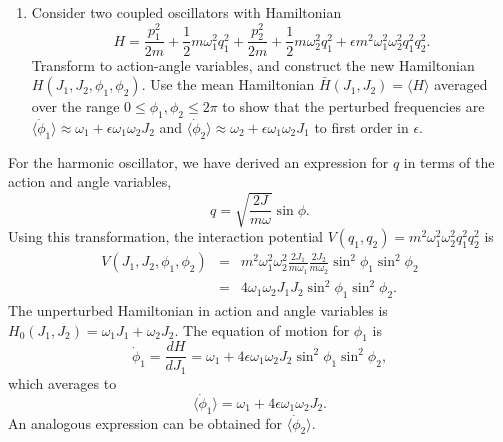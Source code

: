 \documentclass[letterpaper,11pt]{article}
\begin{document}
\begin{enumerate}[resume]
 \item Consider two coupled oscillators with Hamiltonian
 \begin{equation*}
  H = \frac{p_1^2}{2m} + \frac{1}{2} m \omega_1^2 q_1^2 + \frac{p_2^2}{2m} + \frac{1}{2} m \omega_2^2 q_1^2 + \epsilon m^2 \omega_1^2 \omega_2^2 q_1^2 q_2^2.
 \end{equation*}
 Transform to action-angle variables, and construct the new Hamiltonian $H(J_1, J_2, \phi_1, \phi_2)$.  Use the mean Hamiltonian $\bar{H}(J_1,J_2) = \langle H \rangle$ averaged over the range $0 \le \phi_1,\phi_2 \le 2\pi$ to show that the perturbed frequencies are $\langle \dot\phi_1 \rangle \approx \omega_1 + \epsilon \omega_1 \omega_2 J_2$ and $\langle \dot\phi_2 \rangle \approx \omega_2 + \epsilon \omega_1 \omega_2 J_1$ to first order in $\epsilon$.
\end{enumerate}

For the harmonic oscillator, we have derived an expression for $q$ in terms of the action and angle variables,
\begin{equation*}
 q = \sqrt{\frac{2J}{m\omega}} \sin\phi.
\end{equation*}
Using this transformation, the interaction potential $V(q_1,q_2) = m^2 \omega_1^2 \omega_2^2 q_1^2 q_2^2$ is
\begin{eqnarray*}
 V(J_1,J_2,\phi_1,\phi_2) & = & m^2 \omega_1^2 \omega_2^2 \frac{2J_1}{m\omega_1} \frac{2J_2}{m\omega_2} \sin^2\phi_1 \sin^2\phi_2 \\
 & = & 4 \omega_1 \omega_2 J_1 J_2 \sin^2\phi_1 \sin^2\phi_2.
\end{eqnarray*}
The unperturbed Hamiltonian in action and angle variables is $H_0(J_1,J_2) = \omega_1 J_1 + \omega_2 J_2$.  The equation of motion for $\phi_1$ is
\begin{equation*}
 \dot\phi_1 = \frac{dH}{dJ_1} = \omega_1 + 4 \epsilon \omega_1 \omega_2 J_2 \sin^2\phi_1 \sin^2\phi_2,
\end{equation*}
which averages to
\begin{equation*}
 \langle\dot\phi_1\rangle = \omega_1 + 4 \epsilon \omega_1 \omega_2 J_2.
\end{equation*}
An analogous expression can be obtained for $\langle\dot\phi_2\rangle$.
\end{document}
